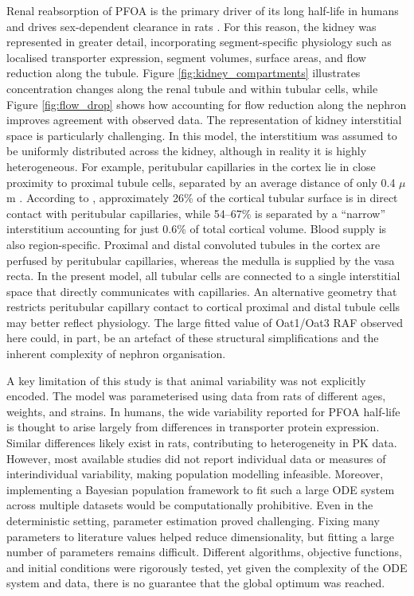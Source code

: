 \documentclass[preprint,12pt,authoryear]{elsarticle}
\begin{document}
Renal reabsorption of PFOA is the primary driver of its long half-life in humans \citep{worley_2017} and drives sex-dependent clearance in rats \citep{worley_2015}. For this reason, the kidney was represented in greater detail, incorporating segment-specific physiology such as localised transporter expression, segment volumes, surface areas, and flow reduction along the tubule. Figure \ref{fig:kidney_compartments} illustrates concentration changes along the renal tubule and within tubular cells, while Figure \ref{fig:flow_drop} shows how accounting for flow reduction along the nephron improves agreement with observed data. The representation of kidney interstitial space is particularly challenging. In this model, the interstitium was assumed to be uniformly distributed across the kidney, although in reality it is highly heterogeneous. For example, peritubular capillaries in the cortex lie in close proximity to proximal tubule cells, separated by an average distance of only 0.4 $\mu$m \citep{gazzard_2025}. According to \citet{lemley_1991}, approximately 26\% of the cortical tubular surface is in direct contact with peritubular capillaries, while 54–67\% is separated by a “narrow” interstitium accounting for just 0.6\% of total cortical volume. Blood supply is also region-specific. Proximal and distal convoluted tubules in the cortex are perfused by peritubular capillaries, whereas the medulla is supplied by the vasa recta. In the present model, all tubular cells are connected to a single interstitial space that directly communicates with capillaries. An alternative geometry that restricts peritubular capillary contact to cortical proximal and distal tubule cells may better reflect physiology. The large fitted value of Oat1/Oat3 RAF  observed here could, in part, be an artefact of these structural simplifications and the inherent complexity of nephron organisation.

A key limitation of this study is that animal variability was not explicitly encoded. The model was parameterised using data from rats of different ages, weights, and strains. In humans, the wide variability reported for PFOA half-life is thought to arise largely from differences in transporter protein expression. Similar differences likely exist in rats, contributing to heterogeneity in PK data. However, most available studies did not report individual data or measures of interindividual variability, making population modelling infeasible. Moreover, implementing a Bayesian population framework to fit such a large ODE system across multiple datasets would be computationally prohibitive. Even in the deterministic setting, parameter estimation proved challenging. Fixing many parameters to literature values helped reduce dimensionality, but fitting a large number of parameters remains difficult. Different algorithms, objective functions, and initial conditions were rigorously tested, yet given the complexity of the ODE system and data, there is no guarantee that the global optimum was reached.
\end{document}
